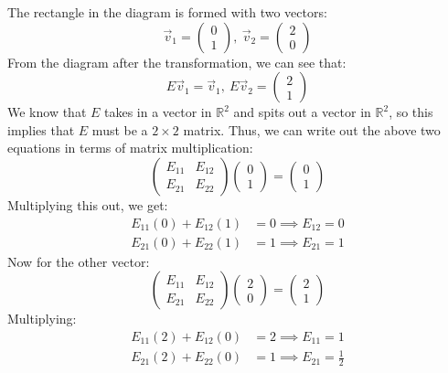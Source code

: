 \documentclass[10pt]{article}
\begin{document}
\begin{enumerate}[label=\alph*)]
			\begin{solution}
				The rectangle in the diagram is formed with two vectors: 
				\[
					\vec v_1 = \begin{pmatrix} 0 \\ 1 \end{pmatrix}, \ \vec v_2 = \begin{pmatrix} 2 \\0 \end{pmatrix} 
				\] 
				From the diagram after the transformation, we can see that: 
				\[
				E \vec v_1 = \vec v_1, \ E \vec v_2 = \begin{pmatrix} 2\\ 1 \end{pmatrix} 
				\] 
				We know that $E$ takes in a vector in $\mathbb R^2$ and spits out a vector in $\mathbb R^2$, 
				so this implies that $E$ must be a $2 \times 2$ matrix. Thus, we can write out the above 
				two equations in terms of matrix multiplication:
				\[
					\begin{pmatrix} E_{11} & E_{12}\\ E_{21} & E_{22} \end{pmatrix} \begin{pmatrix} 0 \\ 1 \end{pmatrix} = \begin{pmatrix} 0\\1 \end{pmatrix} 
				\] 
				Multiplying this out, we get:
				\begin{align*}
					E_{11}(0) + E_{12}(1) &= 0 \implies E_{12} = 0\\
					E_{21}(0) + E_{22}(1) &=  1\implies E_{21} = 1 
				\end{align*}
				Now for the other vector: 
				\[
					\begin{pmatrix} E_{11} & E_{12}\\E_{21} & E_{22} \end{pmatrix} \begin{pmatrix} 2\\ 0 \end{pmatrix} = \begin{pmatrix} 2\\1 \end{pmatrix}  
				\] 
				Multiplying:
				\begin{align*}
					E_{11}(2) + E_{12}(0) &= 2 \implies E_{11} = 1\\
					E_{21}(2) + E_{22}(0) &=  1 \implies E_{21} = \frac{1}{2}

\end{align*}
\end{solution}
\end{enumerate}
\end{document}
